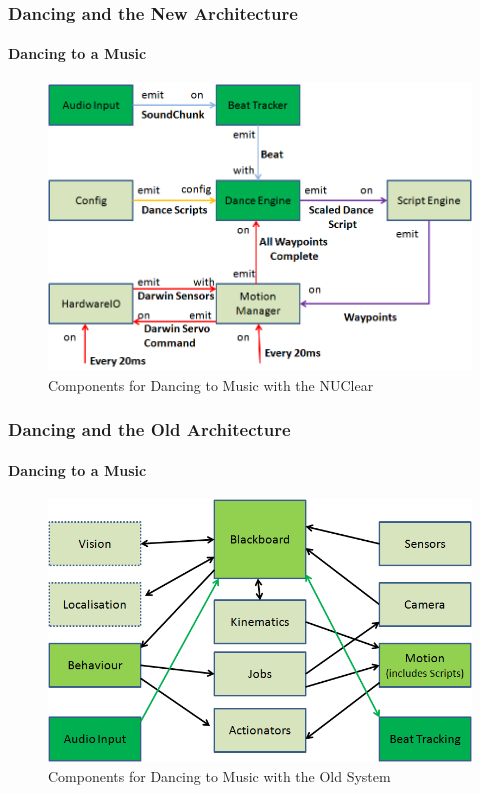 \documentclass{beamer}
\begin{document}
	\begin{frame}
		\frametitle{Dancing and the New Architecture}
		\framesubtitle{Dancing to a Music}
		\begin{figure}
			\centering
			\includegraphics[scale=.45]{Presentation_Images/dance_audio_new_arc_change.png}
			\caption{Components for Dancing to Music with the NUClear}
		\end{figure}
	\end{frame}	
	\begin{frame}
		\frametitle{Dancing and the Old Architecture}
		\framesubtitle{Dancing to a Music}
		\begin{figure}
			\centering
			\includegraphics[scale=.45]{Presentation_Images/dance_audio_old_arc.png}
			\caption{Components for Dancing to Music with the Old System}
		\end{figure}
	\end{frame}	
\end{document}
